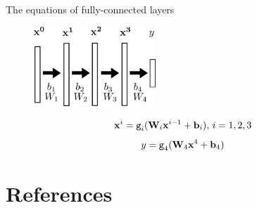 \documentclass[xcolor=pdftex,dvipsnames,table,mathserif]{beamer}
\begin{document}
\begin{frame}{The equations of fully-connected layers}

    \begin{figure}
      \includegraphics[height=3cm]{nn_representation2}
    \end{figure}

    \begin{block}{}
      \[\mathbf{x}^i = \texttt{g}_i(\mathbf{W}_i\mathbf{x}^{i-1} + \mathbf{b}_i),\, i= 1, 2, 3 \]
      \[y = \texttt{g}_4(\mathbf{W}_4\mathbf{x}^4 + \mathbf{b}_4)\]
    \end{block}

\end{frame}


\section*{References}


\end{document}
